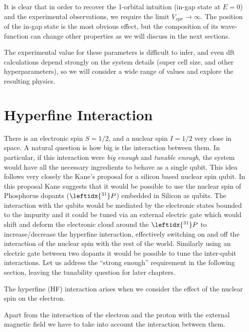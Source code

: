 It is clear that in order to recover the 1-orbital intuition (in-gap state at $E=0$) and the experimental observations\cite{Sofo2012,Brihuega2016}, we require the limit $V_{sp\sigma}\to\infty$. The position of the in-gap state is the most obvious effect, but the composition of its wave-function can change other properties as we will discuss in the next sections.


The experimental value for these parameters is difficult to infer\cite{}, and even \ac{dft} calculations depend strongly on the system details (super cell size, and other hyperparameters), so we will consider a wide range of values and explore the resulting physics.



\section{Hyperfine Interaction}
\label{sec:hyperfine}
There is an electronic spin $S=1/2$, and a nuclear spin $I=1/2$ very close in space. A natural question is how big is the interaction between them. In particular, if this interaction were \emph{big enough} and \emph{tunable enough}, the system would have all the necessary ingredients to behave as a single qubit.
This idea follows very closely the Kane's proposal for a silicon based nuclear spin qubit\cite{Kane1988}. In this proposal Kane suggests that it would be possible to use the nuclear spin of Phosphorus dopants ($\leftidx{^{31}}P$) embedded in Silicon as qubits. The interaction with the qubits would be mediated by the electronic states bounded to the impurity and it could be tuned via an external electric gate which would shift and deform the electronic cloud around the $\leftidx{^{31}}P$ to increase/decrease the hyperfine interaction, effectively switching on and off the interaction of the nuclear spin with the rest of the world.
Similarly using an electric gate between two dopants it would be possible to tune the inter-qubit interactions.
Let us address the ``strong enough'' requirement in the following section, leaving the tunability question for later chapters. 

The hyperfine (HF) interaction arises when we consider the effect of the nuclear spin on the electron.

Apart from the interaction of the electron and the proton with the external magnetic field we have to take into account the interaction between them.

